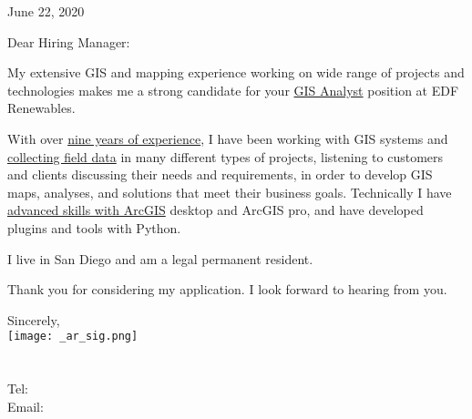 \documentclass[letterpaper]{article}
\newcommand{\impt}[1]{\uline{#1}}
\newcommand{\CVjobTitle}{GIS Analyst}
\newcommand{\CVcompany}{EDF Renewables}
\begin{document}
\large

\null\hfill June 22, 2020
\vspace{1em}

Dear Hiring Manager:

My extensive GIS and mapping experience working on wide range of projects and
technologies makes me a strong candidate for your \impt{\CVjobTitle} position
at \CVcompany.

With over \impt{nine years of experience}, I have been working with GIS systems
and \impt{collecting field data} in many different types of
projects, listening to customers and clients discussing their needs and
requirements, in order to develop GIS maps, analyses, and solutions that meet
their business goals.  
Technically I have \impt{advanced skills with ArcGIS}
desktop and ArcGIS pro, and have developed plugins and tools with Python.

I live in San Diego and am a legal permanent resident.  

Thank you for considering my application.
I look forward to hearing from you.  


Sincerely,\\
    \hspace{1em} 
    \texttt{[image: \_ar\_sig.png]} \\
    \CVname \\
    \small
    \CVaddresswrap \\
    Tel: \CVphone \\
    Email: \CVemail
\end{document}
